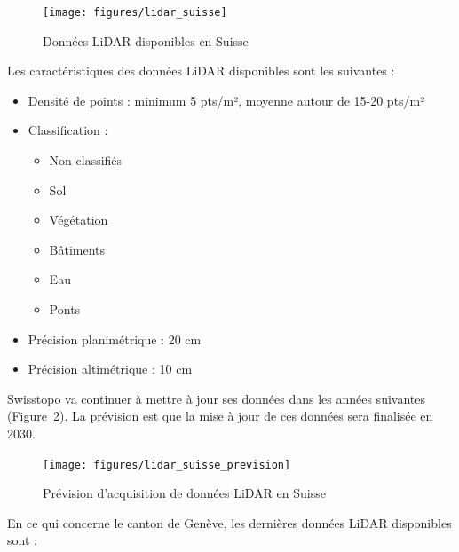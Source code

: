\begin{figure}[htbp]
    \centering
    \texttt{[image: figures/lidar\_suisse]}
    \caption{Données LiDAR disponibles en Suisse \citep{swisstopo_lidar_2024}}
    \label{fig:lidar_suisse}
\end{figure}

Les caractéristiques des données LiDAR disponibles sont les suivantes :
\begin{itemize}
    \item Densité de points : minimum 5 pts/m², moyenne autour de 15-20 pts/m²
    \item Classification :
    \begin{itemize}
        \item Non classifiés
        \item Sol
        \item Végétation
        \item Bâtiments
        \item Eau
        \item Ponts
    \end{itemize}
    \item Précision planimétrique : 20 cm
    \item Précision altimétrique : 10 cm
\end{itemize}

Swisstopo va continuer à mettre à jour ses données dans les années suivantes (Figure~\ref{fig:lidar_suisse_prevision}). La prévision est que la mise à jour de ces données sera finalisée en 2030.

\begin{figure}[htbp]
    \centering
    \texttt{[image: figures/lidar\_suisse\_prevision]}
    \caption{Prévision d'acquisition de données LiDAR en Suisse \citep{swisstopo_lidar_2024}}
    \label{fig:lidar_suisse_prevision}
\end{figure}

En ce qui concerne le canton de Genève, les dernières données LiDAR \citep{sitg_lidar_2021, sitg_lidar_2023} disponibles sont :

